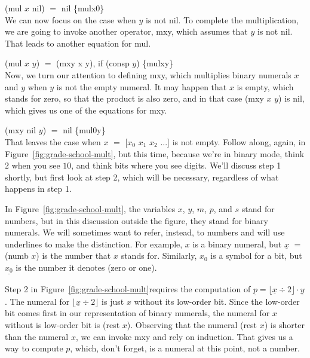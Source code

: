 \hspace*{2cm} \textsf{(mul $x$ nil)} $=$ \textsf{nil} \hspace{2cm} \hfill \{mulx0\}
\\

We can now focus on the case when $y$ is not \textsf{nil}.
To complete the multiplication,
we are going to invoke another operator, \textsf{mxy},
which assumes that $y$ is not \textsf{nil}.
That leads to another equation for \textsf{mul}.

\hspace*{2cm} \textsf{(mul $x$ $y$)} $=$ \textsf{(mxy x y)}, if \textsf{(consp $y$)} \hfill \{mulxy\}
\\

Now, we turn our attention to defining \textsf{mxy}, which multiplies binary
numerals $x$ and $y$ when $y$ is not the empty numeral.
It may happen that $x$ is empty, which stands for zero, so that
the product is also zero, and in that case (mxy $x$ $y$) is \textsf{nil},
which gives us one of the equations for \textsf{mxy}.

\hspace*{2cm} \textsf{(mxy nil $y$)} $=$ \textsf{nil}  \hfill \{mul0y\}
\\

That leaves the case when $x$ $=$ \textsf{[$x_0$ $x_1$ $x_2$ ...]} is not empty.
Follow along, again, in Figure~\ref{fig:grade-school-mult},
but this time, because we're in binary mode, think $2$ when you see $10$,
and think bits where you see digits.
We'll discuss step 1 shortly, but first look at step 2,
which will be necessary, regardless of what happens in step 1.

In Figure~\ref{fig:grade-school-mult}, the variables $x$, $y$, $m$, $p$, and $s$
stand for numbers, but in this discussion outside the figure,
they stand for binary numerals. 
We will sometimes want to refer, instead, to numbers 
and will use underlines to make the distinction.
For example, $x$ is a binary numeral, 
but $\underline{x}$ $=$ \textsf{(numb $x$)}
is the number that $x$ stands for.
Similarly, $x_0$ is a symbol for a bit,
but $\underline{x_0}$ is the number it denotes (zero or one).

Step 2 in Figure~\ref{fig:grade-school-mult}requires the computation of
$\underline{p} = \lfloor \underline{x} \div 2 \rfloor \cdot \underline{y}$.
The numeral for $\lfloor \underline{x} \div 2 \rfloor$ is just $x$ without its
low-order bit. Since the low-order bit comes first
in our representation of binary numerals,
the numeral for $x$ without is low-order bit is \textsf{(rest $x$)}.
Observing that the numeral \textsf{(rest $x$)} 
is shorter than the numeral $x$,
we can invoke \textsf{mxy} and rely on induction.
That gives us a way to compute $p$, which, don't forget,
is a numeral at this point, not a number.

